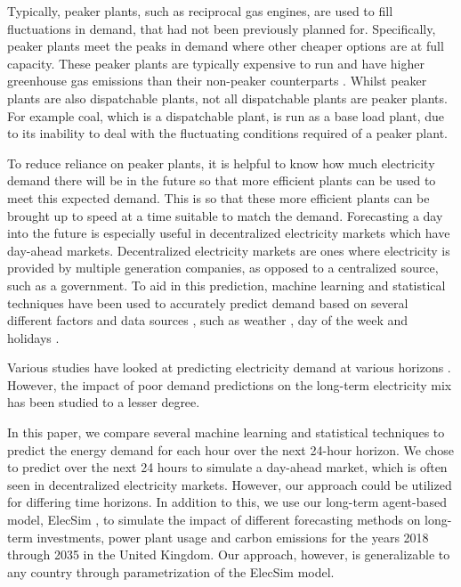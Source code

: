 \documentclass[final,3p,times,twocolumn,numbers]{elsarticle}
\begin{document}
Typically, peaker plants, such as reciprocal gas engines, are used to fill fluctuations in demand, that had not been previously planned for. Specifically, peaker plants meet the peaks in demand where other cheaper options are at full capacity. These peaker plants are typically expensive to run and have higher greenhouse gas emissions than their non-peaker counterparts \cite{Mahmood2014}. Whilst peaker plants are also dispatchable plants, not all dispatchable plants are peaker plants. For example coal, which is a dispatchable plant, is run as a base load plant, due to its inability to deal with the fluctuating conditions required of a peaker plant.

To reduce reliance on peaker plants, it is helpful to know how much electricity demand there will be in the future so that more efficient plants can be used to meet this expected demand. This is so that these more efficient plants can be brought up to speed at a time suitable to match the demand. Forecasting a day into the future is especially useful in decentralized electricity markets which have day-ahead markets. Decentralized electricity markets are ones where electricity is provided by multiple generation companies, as opposed to a centralized source, such as a government. To aid in this prediction, machine learning and statistical techniques have been used to accurately predict demand based on several different factors and data sources \cite{Kell2018a}, such as weather \cite{Hong2014}, day of the week \cite{Al-Musaylh2018} and holidays \cite{Vrablecova2017}. 




Various studies have looked at predicting electricity demand at various horizons \cite{Singh2012,Huang2003,Andersen2013}. However, the impact of poor demand predictions on the long-term electricity mix has been studied to a lesser degree.

In this paper, we compare several machine learning and statistical techniques to predict the energy demand for each hour over the next 24-hour horizon. We chose to predict over the next 24 hours to simulate a day-ahead market, which is often seen in decentralized electricity markets. However, our approach could be utilized for differing time horizons. In addition to this, we use our long-term agent-based model, ElecSim \cite{Kell, Kell2020}, to simulate the impact of different forecasting methods on long-term investments, power plant usage and carbon emissions for the years 2018 through 2035 in the United Kingdom. Our approach, however, is generalizable to any country through parametrization of the ElecSim model.
\end{document}
